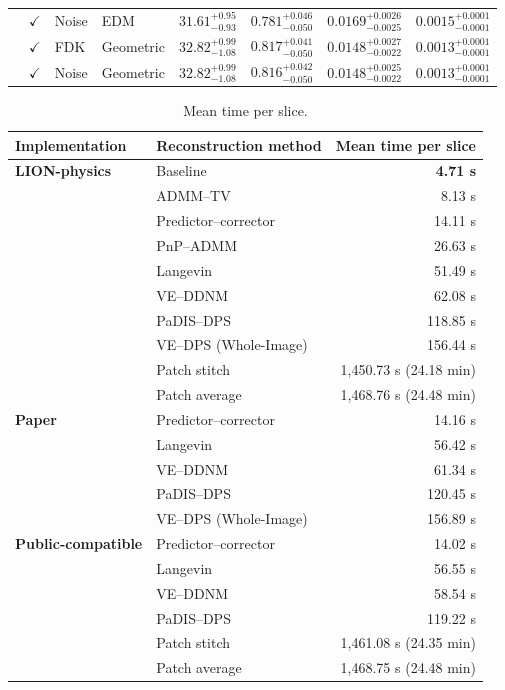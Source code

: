 \begin{table}[p]
{\begin{tabular}{llllcccc}
 & \multicolumn{1}{c}{$\checkmark$} & Noise & EDM & $31.61^{+0.95}_{-0.93}$ & $0.781^{+0.046}_{-0.050}$ & $0.0169^{+0.0026}_{-0.0025}$ & $0.0015^{+0.0001}_{-0.0001}$ \\
 & \multicolumn{1}{c}{$\checkmark$} & FDK & Geometric & $\mathbf{32.82^{+0.99}_{-1.08}}$ & $\mathbf{0.817^{+0.041}_{-0.050}}$ & $\mathbf{0.0148^{+0.0027}_{-0.0022}}$ & $\mathbf{0.0013^{+0.0001}_{-0.0001}}$ \\
 & \multicolumn{1}{c}{$\checkmark$} & Noise & Geometric & $\mathbf{32.82^{+0.99}_{-1.08}}$ & $0.816^{+0.042}_{-0.050}$ & $\mathbf{0.0148^{+0.0025}_{-0.0022}}$ & $\mathbf{0.0013^{+0.0001}_{-0.0001}}$ \\
\bottomrule[1.1pt]
\end{tabular}
}
\end{table}
\clearpage

\begin{table}[p]
\centering
\caption{Mean time per slice.}\label{tab:runtime}
\small
\begin{tabular}{llr}
\toprule[1.1pt]
\multicolumn{1}{l}{\bfseries Implementation} & \multicolumn{1}{l}{\bfseries Reconstruction method} & \multicolumn{1}{r}{\bfseries Mean time per slice} \\
\midrule
\textbf{LION-physics} & Baseline & \textbf{4.71 s} \\
 & ADMM--TV & 8.13 s \\
 & Predictor--corrector & 14.11 s \\
 & PnP--ADMM & 26.63 s \\
 & Langevin & 51.49 s \\
 & VE--DDNM & 62.08 s \\
 & PaDIS--DPS & 118.85 s \\
 & VE--DPS (Whole-Image) & 156.44 s \\
 & Patch stitch & 1,450.73 s (24.18 min) \\
 & Patch average & 1,468.76 s (24.48 min) \\
\midrule
\textbf{Paper} & Predictor--corrector & 14.16 s \\
 & Langevin & 56.42 s \\
 & VE--DDNM & 61.34 s \\
 & PaDIS--DPS & 120.45 s \\
 & VE--DPS (Whole-Image) & 156.89 s \\
\midrule
\textbf{Public-compatible} & Predictor--corrector & 14.02 s \\
 & Langevin & 56.55 s \\
 & VE--DDNM & 58.54 s \\
 & PaDIS--DPS & 119.22 s \\
 & Patch stitch & 1,461.08 s (24.35 min) \\
 & Patch average & 1,468.75 s (24.48 min) \\
\bottomrule[1.1pt]
\end{tabular}
\end{table}
\clearpage

